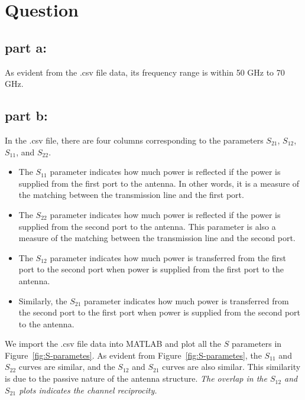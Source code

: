 \documentclass[12pt,onecolumn,a4paper]{article}
\newcommand\question{
	\section{Question \numberstringnum{\thesection}}
}
\begin{document}
	\FloatBarrier
	\question%

	
	\FloatBarrier
	\subsection{part a:}
	As evident from the .csv file data, its frequency range is within 50 GHz to 70 GHz.
	
	
	
	\FloatBarrier
	\subsection{part b:}
	
	In the .csv file, there are four columns corresponding to the parameters $S_{21}$, $S_{12}$, $S_{11}$, and $S_{22}$. 

	\begin{itemize}
		\item The $S_{11}$ parameter indicates how much power is reflected if the power is supplied from the first port to the antenna. 
		In other words, it is a measure of the matching between the transmission line and the first port. 
		\item The $S_{22}$ parameter indicates how much power is reflected if the power is supplied from the second port to the antenna. 
		This parameter is also a measure of the matching between the transmission line and the second port. 
		\item The $S_{12}$ parameter indicates how much power is transferred from the first port to the second port when power is supplied from the first port to the antenna. 
		\item Similarly, the $S_{21}$ parameter indicates how much power is transferred from the second port to the first port when power is supplied from the second port to the antenna. 
	\end{itemize}

	We import the .csv file data into MATLAB and plot all the $S$ parameters in Figure~\ref{fig:S-parametes}. 
	As evident from Figure~\ref{fig:S-parametes}, the $S_{11}$ and $S_{22}$ curves are similar, and the $S_{12}$ and $S_{21}$ curves are also similar. 
	This similarity is due to the passive nature of the antenna structure.
	\textit{The overlap in the $S_{12}$ and $S_{21}$ plots indicates the channel reciprocity.}
	
	
	
\end{document}

